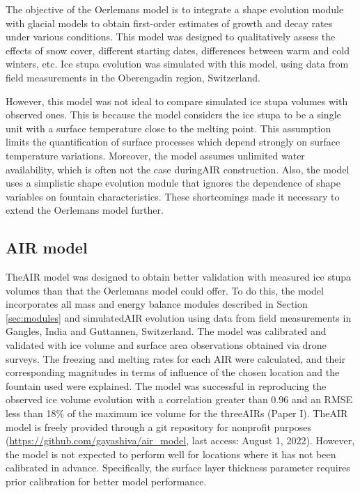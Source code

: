 The objective of the Oerlemans model is to integrate a shape evolution module with glacial models to obtain
first-order estimates of growth and decay rates under various conditions. This model was designed to
qualitatively assess the effects of snow cover, different starting dates, differences between warm and cold
winters, etc. Ice stupa evolution was simulated with this model, using data from field measurements in the Oberengadin region, Switzerland. 

However, this model was not ideal to compare simulated ice stupa volumes with observed ones. This is
because the model considers the ice stupa to be a single unit with a surface temperature close to the melting
point. This assumption limits the quantification of surface processes which depend strongly on surface
temperature variations. Moreover, the model assumes unlimited water availability, which is often not the case
during\ac{AIR} construction. Also, the model uses a simplistic shape evolution module that ignores the dependence of
shape variables on fountain characteristics. These shortcomings made it necessary to extend the Oerlemans
model further.

\subsection{\ac{AIR} model}

The\ac{AIR} model was designed to obtain better validation with measured ice stupa volumes than that the Oerlemans model could offer. To do this, the model incorporates all mass and energy balance modules described in Section
\ref{sec:modules} and simulated\ac{AIR} evolution using data from field measurements in Gangles, India and
Guttannen, Switzerland. The model was calibrated and validated with ice volume and surface area observations
obtained via drone surveys. The freezing and melting rates for each \ac{AIR} were calculated, and
their corresponding magnitudes in terms of influence of the chosen location and the fountain used were explained.
The model was successful in reproducing the observed ice volume evolution with a correlation greater than 0.96
and an \ac{RMSE} less than 18\% of the maximum ice volume for the three\ac{AIRs} (Paper I). The\ac{AIR} model is freely
provided through a git repository for nonprofit purposes (\url{https://github.com/gayashiva/air_model}, last
access: August 1, 2022). However, the model is not expected to perform well for locations where it has not been calibrated in advance. Specifically, the surface layer thickness parameter requires prior calibration for better model performance.

